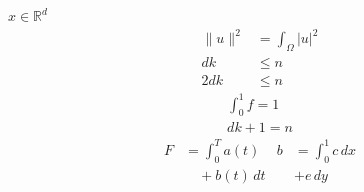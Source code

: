 \documentclass{article}
\begin{document}
$x\in\mathbb{R}^d$
\begin{align}
\|u\|^2 &= \int_\Omega |u|^2 \\
dk &\le n \\
2dk &\le n
\end{align}
\begin{gather}
\int_0^1 f = 1\\
dk+1 = n
\end{gather}
\begin{align*}
F &= \int_0^T a(t) & b &= \int_0^1 c\,dx\\
  &\quad+ b(t)\,dt & & + e\,dy
\end{align*}
\end{document}
